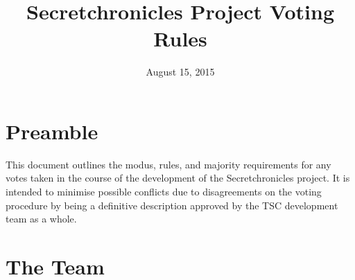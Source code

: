 \documentclass[10pt,a4paper,DIV=calc,headings=medium,twocolumn,final]{scrartcl}
\begin{document}
\title{Secretchronicles Project Voting Rules}
\date{August 15, 2015}
\maketitle{}

\section*{Preamble}

This document outlines the modus, rules, and majority requirements for
any votes taken in the course of the development of the
Secretchronicles project. It is intended to minimise possible
conflicts due to disagreements on the voting procedure by being a
definitive description approved by the TSC development team as a
whole.

\section{The Team}
\end{document}
